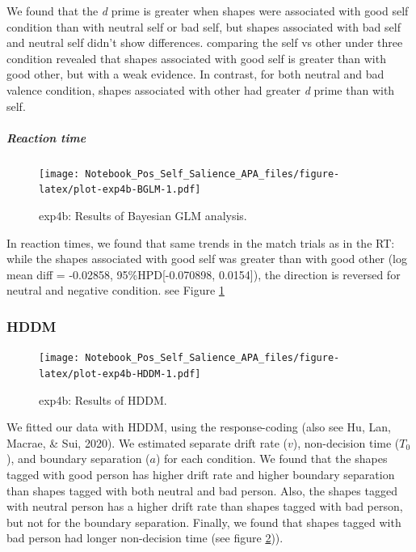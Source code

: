 \documentclass[
  english,
  man]{apa6}
\let\oldsubparagraph\subparagraph
\renewcommand{\subparagraph}[1]{\oldsubparagraph{#1}\mbox{}}
\begin{document}
We found that the \emph{d} prime is greater when shapes were associated with good self condition than with neutral self or bad self, but shapes associated with bad self and neutral self didn't show differences. comparing the self vs other under three condition revealed that shapes associated with good self is greater than with good other, but with a weak evidence. In contrast, for both neutral and bad valence condition, shapes associated with other had greater \emph{d} prime than with self.

\hypertarget{reaction-time-13}{%
\subparagraph{Reaction time}\label{reaction-time-13}}

\begin{figure}
\centering
\texttt{[image: Notebook\_Pos\_Self\_Salience\_APA\_files/figure-latex/plot-exp4b-BGLM-1.pdf]}
\caption{\label{fig:plot-exp4b-BGLM}exp4b: Results of Bayesian GLM analysis.}
\end{figure}

In reaction times, we found that same trends in the match trials as in the RT: while the shapes associated with good self was greater than with good other (log mean diff = -0.02858, 95\%HPD{[}-0.070898, 0.0154{]}), the direction is reversed for neutral and negative condition. see Figure \ref{fig:plot-exp4b-BGLM}

\hypertarget{hddm-9}{%
\subsubsection{HDDM}\label{hddm-9}}

\begin{figure}
\centering
\texttt{[image: Notebook\_Pos\_Self\_Salience\_APA\_files/figure-latex/plot-exp4b-HDDM-1.pdf]}
\caption{\label{fig:plot-exp4b-HDDM}exp4b: Results of HDDM.}
\end{figure}

We fitted our data with HDDM, using the response-coding (also see Hu, Lan, Macrae, \& Sui, 2020). We estimated separate drift rate (\(v\)), non-decision time (\(T_{0}\)), and boundary separation (\(a\)) for each condition. We found that the shapes tagged with good person has higher drift rate and higher boundary separation than shapes tagged with both neutral and bad person. Also, the shapes tagged with neutral person has a higher drift rate than shapes tagged with bad person, but not for the boundary separation. Finally, we found that shapes tagged with bad person had longer non-decision time (see figure \ref{fig:plot-exp4b-HDDM})).
\end{document}
